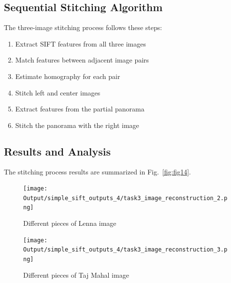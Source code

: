 \documentclass[12pt,a4paper]{article}
\begin{document}
\subsection{Sequential Stitching Algorithm}

The three-image stitching process follows these steps:

\begin{enumerate}
    \item Extract SIFT features from all three images
    \item Match features between adjacent image pairs
    \item Estimate homography for each pair
    \item Stitch left and center images
    \item Extract features from the partial panorama
    \item Stitch the panorama with the right image
\end{enumerate}

\subsection{Results and Analysis}

The stitching process results are summarized in Fig.~\ref{fig:fig14}.


\begin{figure}[!ht]
\centering
\texttt{[image: Output/simple\_sift\_outputs\_4/task3\_image\_reconstruction\_2.png]}
\caption{Different pieces of Lenna image}
\label{fig:fig12}
\end{figure}

\begin{figure}[!ht]
\centering
\texttt{[image: Output/simple\_sift\_outputs\_4/task3\_image\_reconstruction\_3.png]}
\caption{Different pieces of Taj Mahal image}
\label{fig:fig13}
\end{figure}
\end{document}
